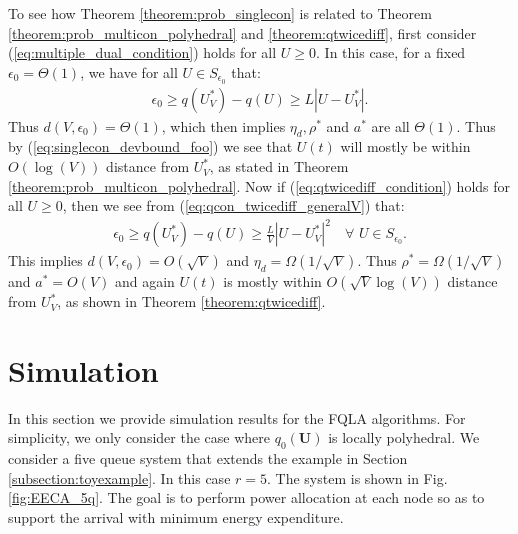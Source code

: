 \documentclass[journal]{IEEEtran}
\newcommand{\bv}[1]{{\boldsymbol{#1} }}
\begin{document}
To see how Theorem \ref{theorem:prob_singlecon} is related to Theorem \ref{theorem:prob_multicon_polyhedral} and \ref{theorem:qtwicediff},    first consider (\ref{eq:multiple_dual_condition}) holds for all $U\geq0$. In this case, for a fixed $\epsilon_0=\Theta(1)$, we  have for all $U\in S_{\epsilon_0}$ that: 
\begin{eqnarray*}
\epsilon_0\geq q(U^*_V)-q(U)\geq L|U-U^*_V|.
\end{eqnarray*}
Thus $d(V, \epsilon_0)=\Theta(1)$, which then implies $\eta_d, \rho^*$ and $a^*$ are all $\Theta(1)$. Thus by (\ref{eq:singlecon_devbound_foo}) we see that $U(t)$ will mostly be within $O(\log(V))$ distance from $U^*_V$, as stated in Theorem \ref{theorem:prob_multicon_polyhedral}. Now if (\ref{eq:qtwicediff_condition}) holds for all $U\geq0$, then we see from (\ref{eq:qcon_twicediff_generalV}) that: 
\begin{eqnarray*}
\epsilon_0\geq q(U^*_V)-q(U)\geq \frac{L}{V}|U-U^*_V|^2 \quad\forall\,\, U\in S_{\epsilon_0}.
\end{eqnarray*}
This implies $d(V,\epsilon_0)=O(\sqrt{V})$ and $\eta_d=\Omega(1/\sqrt{V})$. Thus $\rho^*=\Omega(1/\sqrt{V})$ and $a^*=O(V)$ and again $U(t)$ is mostly within $O(\sqrt{V}\log(V))$ distance from $U^*_V$, as shown in Theorem \ref{theorem:qtwicediff}. 





\vspace{-.1in}
\section{Simulation}\label{section:numerical}
In this section we provide simulation results for the FQLA algorithms. For simplicity, we only consider the case where $q_0(\bv{U})$ is locally polyhedral. We consider a five queue system that extends the example in Section \ref{subsection:toyexample}. In this case  $r=5$. The system is shown in Fig. \ref{fig:EECA_5q}. The goal is to perform power allocation at each node so as to support the arrival with minimum energy expenditure. 
\end{document}
